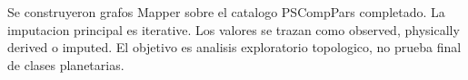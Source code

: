 Se construyeron grafos Mapper sobre el catalogo PSCompPars completado. La imputacion principal es iterative. Los valores se trazan como observed, physically derived o imputed. El objetivo es analisis exploratorio topologico, no prueba final de clases planetarias.
